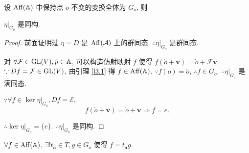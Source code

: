 \documentclass{ctexart}
\begin{document}
设 $\operatorname{Aff} (\mathbb{A})$ 中保持点 $\dot{o}$ 不变的变换全体为 $G_{\dot{o}}$, 则
\begin{lemma}\label{l3.3}
    $\eta|_{G_{\dot{o}}}$ 是同构.
\end{lemma}
\begin{proof}
    前面证明过 $\eta=D$ 是 $\operatorname{Aff} (\mathcal{A})$ 上的群同态. $\therefore\eta|_{G_{\dot{o}}}$ 是群同态.

    对 $\forall\mathcal{F}\in\operatorname{GL} (V),\dot{p}\in\mathbb{A}$, 可以构造仿射映射 $f$ 使得 $f(\dot{o}+\boldsymbol{v})=\dot{o}+\mathcal{F}\boldsymbol{v}$. $\because Df=\mathcal{F}\in\operatorname{GL} (V)$, 由引理 \ref{l3.1} 得 $f\in\operatorname{Aff} (\mathbb{A})$. $\because f(\dot{o})=\dot{o}$, $\therefore f\in G_{\dot{o}}$. $\therefore \eta|_{G_{\dot{o}}}$ 是满同态.
    
    $\because\forall f\in\ker\eta|_{G_{\dot{o}}},Df=\mathcal{E}$,
    \[f(\dot{o}+\boldsymbol{v})=\dot{o}+\boldsymbol{v}\Rightarrow f=e.\]

    $\therefore\ker\eta|_{G_{\dot{o}}}=\{e\}$. $\therefore\eta|_{G_{\dot{o}}}$ 是同构.
\end{proof}
\begin{theorem}\label{t3.1}
    $\forall f\in\operatorname{Aff} (\mathbb{A})$, $\exists!t_{\boldsymbol{a}}\in T,g\in G_{\dot{o}}$ 使得 $f=t_{\boldsymbol{a}}g$.
\end{theorem}
\end{document}
